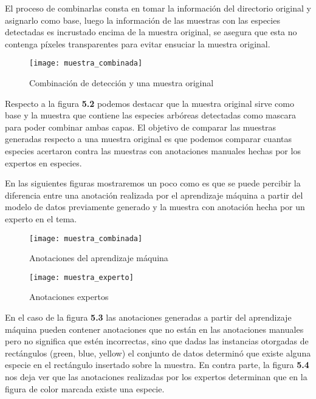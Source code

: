 El proceso de combinarlas consta en tomar la información del directorio original y asignarlo como base, luego la información de las muestras con las especies detectadas es incrustado encima de la muestra original, se asegura que esta no contenga píxeles transparentes para evitar ensuciar la muestra original.

\begin{figure}[H]
  \centering
  \begin{minipage}[b]{0.8\textwidth}
        \texttt{[image: muestra\_combinada]}
    \caption{Combinación de detección y una muestra original}
  \end{minipage}
\end{figure}

Respecto a la figura \textbf{5.2} podemos destacar que la muestra original sirve como base y la muestra que contiene las especies arbóreas detectadas como mascara para poder combinar ambas capas. El objetivo de comparar las muestras generadas respecto a una muestra original es que podemos comparar cuantas especies acertaron contra las muestras con anotaciones manuales hechas por los expertos en especies.

\break


En las siguientes figuras mostraremos un poco como es que se puede percibir la diferencia entre una anotación realizada por el aprendizaje máquina a partir del modelo de datos previamente generado y la muestra con anotación hecha por un experto en el tema. \\

\begin{figure}[H]
  \centering
  \begin{minipage}[b]{0.4\textwidth}
    \texttt{[image: muestra\_combinada]}
    \caption{Anotaciones del aprendizaje máquina}
  \end{minipage}
  \hfill
  \begin{minipage}[b]{0.4\textwidth}
    \texttt{[image: muestra\_experto]}
    \caption{Anotaciones expertos}
  \end{minipage}
\end{figure}

En el caso de la figura \textbf{5.3} las anotaciones generadas a partir del aprendizaje máquina pueden contener anotaciones que no están en las anotaciones manuales pero no significa que estén incorrectas, sino que dadas las instancias otorgadas de rectángulos (green, blue, yellow) el conjunto de datos determinó que existe alguna especie en el rectángulo insertado sobre la muestra. En contra parte, la figura \textbf{5.4} nos deja ver que las anotaciones realizadas por los expertos determinan que en la figura de color marcada existe una especie.

